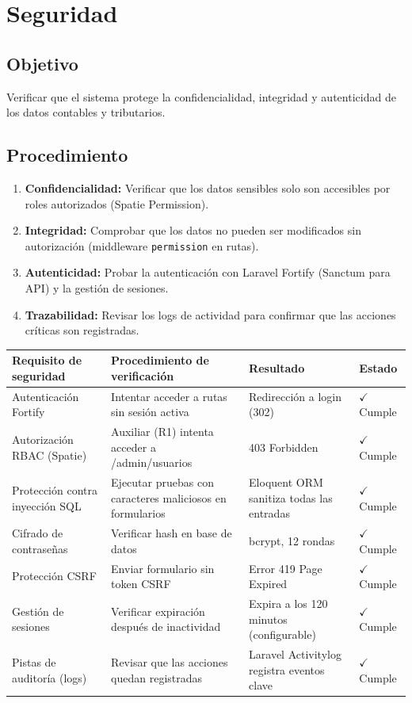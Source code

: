\documentclass[stu]{apa7}
\begin{document}
\section{Seguridad}

\subsection{Objetivo}

Verificar que el sistema protege la confidencialidad, integridad y autenticidad de los datos contables y tributarios.

\subsection{Procedimiento}

\begin{enumerate}
    \item \textbf{Confidencialidad:} Verificar que los datos sensibles solo son accesibles por roles autorizados (Spatie Permission).
    \item \textbf{Integridad:} Comprobar que los datos no pueden ser modificados sin autorización (middleware \texttt{permission} en rutas).
    \item \textbf{Autenticidad:} Probar la autenticación con Laravel Fortify (Sanctum para API) y la gestión de sesiones.
    \item \textbf{Trazabilidad:} Revisar los logs de actividad para confirmar que las acciones críticas son registradas.
\end{enumerate}

\begin{longtable}{|L{4.5cm}|L{4.5cm}|C{3cm}|C{1.5cm}|}
\hline
{}
\textbf{Requisito de seguridad} & \textbf{Procedimiento de verificación} & \textbf{Resultado} & \textbf{Estado} \\
\hline
Autenticación Fortify & Intentar acceder a rutas sin sesión activa & Redirección a login (302) & $\checkmark$ Cumple \\
\hline
Autorización RBAC (Spatie) & Auxiliar (R1) intenta acceder a /admin/usuarios & 403 Forbidden & $\checkmark$ Cumple \\
\hline
Protección contra inyección SQL & Ejecutar pruebas con caracteres maliciosos en formularios & Eloquent ORM sanitiza todas las entradas & $\checkmark$ Cumple \\
\hline
Cifrado de contraseñas & Verificar hash en base de datos & bcrypt, 12 rondas & $\checkmark$ Cumple \\
\hline
Protección CSRF & Enviar formulario sin token CSRF & Error 419 Page Expired & $\checkmark$ Cumple \\
\hline
Gestión de sesiones & Verificar expiración después de inactividad & Expira a los 120 minutos (configurable) & $\checkmark$ Cumple \\
\hline
Pistas de auditoría (logs) & Revisar que las acciones quedan registradas & Laravel Activitylog registra eventos clave & $\checkmark$ Cumple \\
\hline
\end{longtable}
\end{document}
